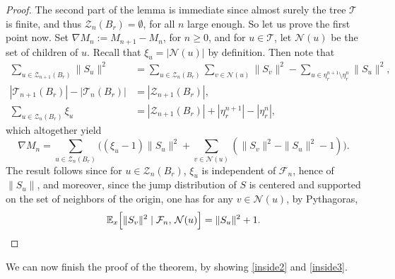 \documentclass[11pt]{article}
\numberwithin{equation}{section}
\theoremstyle{plain}
\theoremstyle{definition}
\newcommand{\1}{{\text{\Large $\mathfrak 1$}}}
\begin{document}
\begin{proof}
The second part of the lemma is immediate
since almost surely the tree $\mathcal T$ is finite, and thus $\mathcal Z_n(B_r)= \emptyset$,
for all $n$ large enough.
So let us prove the first point now. Set $\nabla M_n := M_{n+1}- M_n$,
for $n\ge 0$, and for $u\in \mathbf{\mathcal T}$,
let $\mathcal N(u)$ be the set of children of $u$.
Recall that $\xi_u = |\mathcal N(u)|$ by definition.
Then note that
\begin{align*}
\sum_{u\in \mathcal Z_{n+1}(B_r)} \|S_u\|^2 &= \sum_{u\in \mathcal Z_n(B_r)} \sum_{v\in \mathcal N(u)} \|S_v\|^2 -
\sum_{u\in \eta_r^{n+1}\setminus \eta_r^n} \|S_u\|^2, \\
|\mathcal T_{n+1}(B_r)| -|\mathcal T_n(B_r)| &= |\mathcal Z_{n+1}(B_r)|, \\
\sum_{u\in \mathcal Z_n(B_r)} \xi_u &= |\mathcal Z_{n+1}(B_r)| + |\eta_r^{n+1}| - |\eta_r^n|,
\end{align*}
which altogether yield
\begin{equation}\label{nablaM}
\nabla M_n = \sum_{u\in \mathcal Z_n(B_r)} \Big((\xi_u - 1) \|S_u\|^2 + \sum_{v\in \mathcal N(u)} (\|S_v\|^2 - \|S_u\|^2-1)\Big).
\end{equation}
The result follows since for $u \in \mathcal Z_n(B_r)$,
$\xi_u$ is independent of $\mathcal F_n$, hence of $\|S_u\|$, and moreover, since the jump
distribution of $S$ is centered and supported on the set of
neighbors of the origin, one has for any $v\in \mathcal N(u)$, by Pythagoras,
\[
\mathbb E_x\Big[ \|S_v\|^2 \mid \mathcal F_n, \, \mathcal N(u)\Big] = \|S_u\|^2 + 1.\qedhere
\]
\end{proof}

We can now finish the proof of the theorem,
by showing \eqref{inside2} and \eqref{inside3}.
\end{document}
